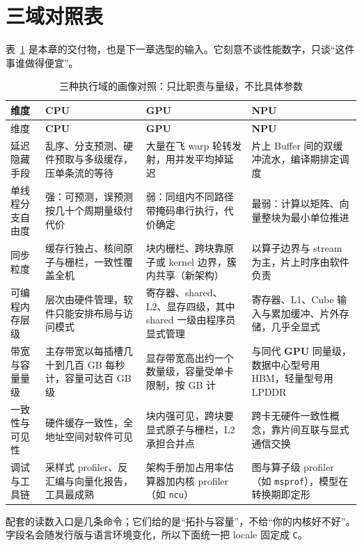 \documentclass[12pt,a4paper,fontset=fandol]{ctexbook}
\newcommand{\Tp}[1]{\texttt{#1}}
\newcommand{\Dom}[1]{\textsf{\bfseries #1}}
\newcommand{\CPU}{\Dom{CPU}}
\newcommand{\GPU}{\Dom{GPU}}
\newcommand{\NPU}{\Dom{NPU}}
\begin{document}
\section{三域对照表}

表~\ref{tab:ch2-domains} 是本章的交付物，也是下一章选型的输入。它刻意不谈性能数字，只谈``这件事谁做得便宜''。

\begin{longtable}{@{}>{\raggedright\arraybackslash}p{}
  >{\raggedright\arraybackslash}p{}
  >{\raggedright\arraybackslash}p{}
  >{\raggedright\arraybackslash}p{}@{}}
\caption{三种执行域的画像对照：只比职责与量级，不比具体参数}\label{tab:ch2-domains}\\
\toprule
维度 & \CPU{} & \GPU{} & \NPU{} \\
\midrule
\endfirsthead
\toprule
维度 & \CPU{} & \GPU{} & \NPU{} \\
\midrule
\endhead
\bottomrule
\endfoot
延迟隐藏手段 &
  乱序、分支预测、硬件预取与多级缓存，压单条流的等待 &
  大量在飞 warp 轮转发射，用并发平均掉延迟 &
  片上 Buffer 间的双缓冲流水，编译期排定调度 \\
单线程分支自由度 &
  强：可预测，误预测按几十个周期量级付代价 &
  弱：同组内不同路径带掩码串行执行，代价确定 &
  最弱：计算以矩阵、向量整块为最小单位推进 \\
同步粒度 &
  缓存行独占、核间原子与栅栏，一致性覆盖全机 &
  块内栅栏、跨块靠原子或 kernel 边界，簇内共享（新架构）&
  以算子边界与 stream 为主，片上时序由软件负责 \\
可编程内存层级 &
  层次由硬件管理，软件只能安排布局与访问模式 &
  寄存器、shared、L2、显存四级，其中 shared 一级由程序员显式管理 &
  寄存器、L1、Cube 输入与累加缓冲、片外存储，几乎全显式 \\
带宽与容量量级 &
  主存带宽以每插槽几十到几百 GB 每秒计，容量可达百 GB 级&
  显存带宽高出约一个数量级，容量受单卡限制，按 GB 计&
  与同代 \GPU{} 同量级，数据中心型号用 HBM，轻量型号用 LPDDR \\
一致性与可见性 &
  硬件缓存一致性，全地址空间对软件可见 &
  块内强可见，跨块要显式原子与栅栏，L2 承担合并点 &
  跨卡无硬件一致性概念，靠片间互联与显式通信交换 \\
调试与工具链 &
  采样式 profiler、反汇编与向量化报告，工具最成熟 &
  架构手册加占用率估算器加内核 profiler（如 \Tp{ncu}）&
  图与算子级 profiler（如 \Tp{msprof}），模型在转换期即定形 \\
\end{longtable}

配套的读数入口是几条命令；它们给的是``拓扑与容量''，不给``你的内核好不好''。字段名会随发行版与语言环境变化，所以下面统一把 locale 固定成 \Tp{C}。
\end{document}
